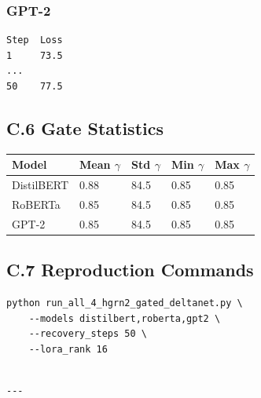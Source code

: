 \subsubsection{GPT-2}
\begin{lstlisting}
Step  Loss
1     73.5
...
50    77.5
\end{lstlisting}

\subsection{C.6 Gate Statistics}

\begin{table}[H]
\centering
\small
\begin{tabular}{lllll}
\toprule
\textbf{Model} & \textbf{Mean $\gamma$} & \textbf{Std $\gamma$} & \textbf{Min $\gamma$} & \textbf{Max $\gamma$} \\
\midrule
DistilBERT & 0.88 & 84.5 & 0.85 & 0.85 \\
RoBERTa & 0.85 & 84.5 & 0.85 & 0.85 \\
GPT-2 & 0.85 & 84.5 & 0.85 & 0.85 \\
\bottomrule
\end{tabular}
\end{table}

\subsection{C.7 Reproduction Commands}

\begin{lstlisting}
python run_all_4_hgrn2_gated_deltanet.py \
    --models distilbert,roberta,gpt2 \
    --recovery_steps 50 \
    --lora_rank 16
\end{lstlisting}
\begin{lstlisting}

---
\end{lstlisting}